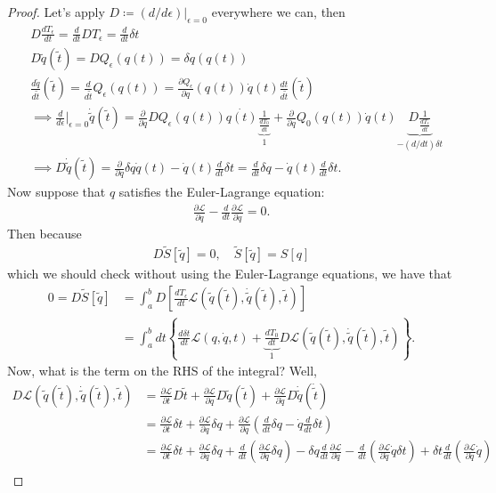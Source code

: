 \documentclass{book}
\theoremstyle{definition}
\newcommand{\p}{\partial}
\newcommand{\lag}{\mathcal{L}}
\newcommand{\nn}{\nonumber}
\newcommand{\ep}{\epsilon}
\newcommand{\f}[2]{\frac{#1}{#2}}
\newcommand{\td}[1]{\tilde{#1}}
\newcommand{\lp}{\left(}
\newcommand{\rp}{\right)}
\newcommand{\lb}{\left[}
\newcommand{\rb}{\right]}
\newcommand{\lc}{\left\{}
\newcommand{\rc}{\right\}}
\begin{document}
\begin{proof}
	Let's apply $D \coloneq (d/d\epsilon)\big\vert_{\epsilon=0}$ everywhere we can, then 
	\begin{align}
	&D\f{dT_\epsilon}{dt} = \f{d}{dt}DT_\epsilon = \f{d}{dt}\delta t\nn\\
	&D\td{q}(\td{t}) = DQ_\epsilon (q(t)) = \delta q(q(t))\nn\\
	&\f{d\td{q}}{d\td{t}}(\td{t}) = \f{d}{d\td{t}}Q_\epsilon(q(t)) = \f{\p Q_\epsilon}{\p q}(q(t))\dot{q}(t) \f{dt}{d\td{t}}(\td{t})\nn\\
	&\implies \f{d}{d\ep}\bigg\vert_{\ep=0} \dot{\td{q}}(\td{t}) = \f{\p}{\p q}DQ_\epsilon (q(t)) \dot{q(t)}\underbrace{\f{1}{\f{dT_0}{dt}}}_{1} + \f{\p}{\p q}Q_0(q(t))\dot{q}(t)\underbrace{D\f{1}{\f{dT_\epsilon}{dt}}}_{-(d/dt)\delta t}\nn\\
	&\implies D\dot{\td{q}}(\td{t}) = \f{\p}{\p q}\delta q \dot{q}(t) - \dot{q}(t) \f{d}{dt}\delta t = \f{d}{dt}\delta q - \dot{q}(t)\f{d}{dt}\delta t.
	\end{align}
	Now suppose that $q$ satisfies the Euler-Lagrange equation:
	\begin{align}
	\f{\p \lag}{\p q} - \f{d}{dt}\f{\p \lag}{\p \dot{q}} = 0.
	\end{align}
	Then because
	\begin{align}
	D\td{S}[\td{q}] = 0, \quad \td{S}[\td{q}] = S[q]
	\end{align}
	which we should check without using the Euler-Lagrange equations, we have that	
	\begin{align}
	0 = D\td{S}[\td{q}] &= \int^b_a D\lb \f{dT_\ep}{dt}\lag(\td{q}(\td{t}),\dot{\td{q}}(\td{t}) , \td{t}) \rb\nn\\
	&= \int^b_a dt\lc \f{d\delta t}{dt} \lag(q,\dot{q},t) + \underbrace{\f{dT_0}{dt}}_{1}D\lag(\td{q}(\td{t}),\dot{\td{q}}(\td{t}) , \td{t}) \rc.
	\end{align}
	Now, what is the term on the RHS of the integral? Well,
	\begin{align}
	D\lag(\td{q}(\td{t}),\dot{\td{q}}(\td{t}) , \td{t})
	&= \f{\p \lag}{\p t}D\td{t} + \f{\p \lag}{\p q}D\td{q}(\td{t}) + \f{\p \lag}{\p \dot{q}} D\dot{\td{q}}(\dot{\td{t}})\nn\\
	&= \f{\p \lag}{\p t}\delta t + \f{\p \lag}{\p q}\delta q + \f{\p \lag}{\p \dot{q}}\lp \f{d}{dt}\delta q - \dot{q} \f{d}{dt}\delta t \rp\nn\\
	&= \f{\p \lag}{\p t}\delta t + \f{\p \lag}{\p q}\delta q + \f{d}{dt}\lp \f{\p \lag}{\p \dot{q}}\delta q \rp - \delta q\f{d}{dt}\f{\p \lag}{\p \dot{q}} - \f{d}{dt}\lp \f{\p \lag}{\p \dot{q}}\dot{q}\delta t \rp + \delta t\f{d}{dt}\lp  \f{\p \lag}{\p \dot{q}}\dot{q} \rp\nn\\

\end{align}
\end{proof}
\end{document}

